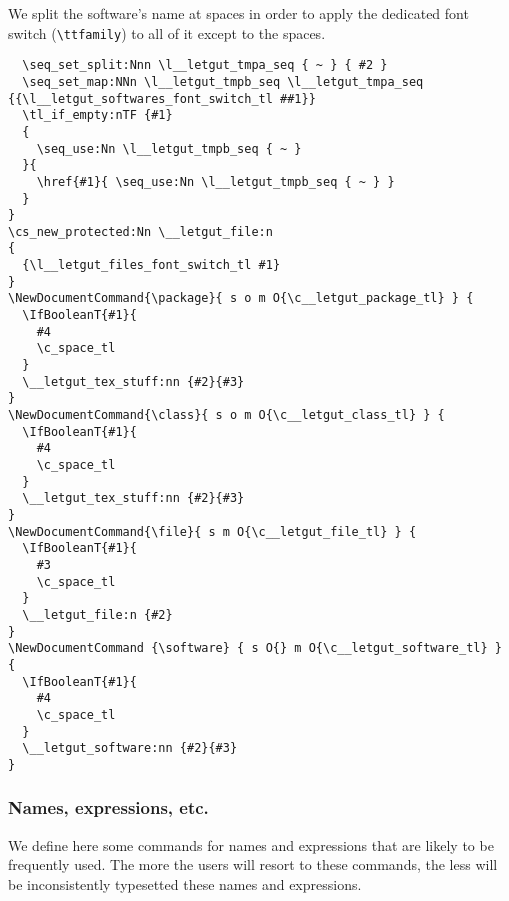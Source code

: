 \documentclass{letgut}
\begin{document}
We split the software's name at spaces in order to apply the dedicated
font switch (\lstinline+\ttfamily+) to all of it except to the spaces.

\begin{lstlisting}
  \seq_set_split:Nnn \l__letgut_tmpa_seq { ~ } { #2 }
  \seq_set_map:NNn \l__letgut_tmpb_seq \l__letgut_tmpa_seq {{\l__letgut_softwares_font_switch_tl ##1}}
  \tl_if_empty:nTF {#1}
  {
    \seq_use:Nn \l__letgut_tmpb_seq { ~ }
  }{
    \href{#1}{ \seq_use:Nn \l__letgut_tmpb_seq { ~ } }
  }
}
\cs_new_protected:Nn \__letgut_file:n
{
  {\l__letgut_files_font_switch_tl #1}
}
\NewDocumentCommand{\package}{ s o m O{\c__letgut_package_tl} } {
  \IfBooleanT{#1}{
    #4
    \c_space_tl
  }
  \__letgut_tex_stuff:nn {#2}{#3}
}
\NewDocumentCommand{\class}{ s o m O{\c__letgut_class_tl} } {
  \IfBooleanT{#1}{
    #4
    \c_space_tl
  }
  \__letgut_tex_stuff:nn {#2}{#3}
}
\NewDocumentCommand{\file}{ s m O{\c__letgut_file_tl} } {
  \IfBooleanT{#1}{
    #3
    \c_space_tl
  }
  \__letgut_file:n {#2}
}
\NewDocumentCommand {\software} { s O{} m O{\c__letgut_software_tl} } {
  \IfBooleanT{#1}{
    #4
    \c_space_tl
  }
  \__letgut_software:nn {#2}{#3}
}
\end{lstlisting}

\subsubsection{Names, expressions, etc.}
\label{ImplementationDocumentcommandsNamesexpressionsetc-11vg55h0jlj0}
We define here some commands for names and expressions that are likely to be
frequently used. The more the users will resort to these commands, the less
will be inconsistently typesetted these names and expressions.
\end{document}
